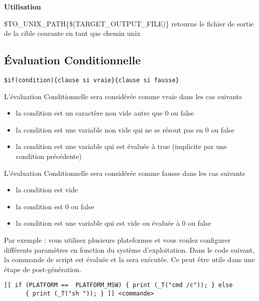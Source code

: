 \textbf{Utilisation}
\begin{codeentry}
\item[\$TO\_UNIX\_PATH\{\$(TARGET\_OUTPUT\_FILE)\}] retourne le fichier de sortie de la cible courante en tant que chemin unix
\end{codeentry}

\subsection{Évaluation Conditionnelle}

\begin{lstlisting}
$if(condition){clause si vraie}{clause si fausse}
\end{lstlisting}

L'évaluation Conditionnelle sera considérée comme vraie dans les cas suivants

\begin{itemize}
\item la condition est un caractère non vide autre que 0 ou false
\item la condition est une variable non vide qui ne se résout pas en 0 ou false
\item la condition est une variable qui est évaluée à true (implicite par une condition précédente)
\end{itemize}

L'évaluation Conditionnelle sera considérée comme fausse dans les cas suivants

\begin{itemize}
\item la condition est vide
\item la condition est 0 ou false
\item la condition est une variable qui est vide ou évaluée à 0 ou false
\end{itemize}



Par exemple : vous utilisez plusieurs plateformes et vous voulez configurer différents paramètres en fonction du système d'exploitation. Dans le code suivant, la commande de script \codeline{[[ ]]} est évaluée et la  sera exécutée. Ce peut être utile dans une étape de post-génération.

\begin{lstlisting}
[[ if (PLATFORM ==  PLATFORM_MSW) { print (_T("cmd /c")); } else 
      { print (_T("sh ")); } ]] <commande>
\end{lstlisting}

